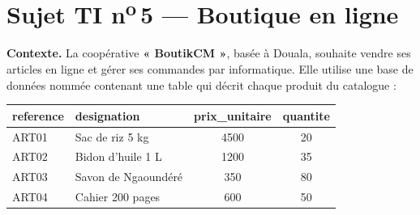 \section{Sujet TI n\textsuperscript{o}\,5 — Boutique en ligne}

\begin{center}
\setlength{\fboxsep}{8pt}
\end{center}

\medskip
\noindent\textbf{Contexte.} La coopérative \textbf{« BoutikCM »}, basée à Douala,
souhaite vendre ses articles en ligne et gérer ses commandes par informatique. Elle
utilise une base de données nommée  contenant une table 
qui décrit chaque produit du catalogue :

\begin{center}\small
\begin{tabular}{@{}|l|l|c|c|@{}}
\hline
\textbf{reference} & \textbf{designation} & \textbf{prix\_unitaire} & \textbf{quantite}\\
\hline
ART01 & Sac de riz 5 kg  & 4500  & 20\\
\hline
ART02 & Bidon d'huile 1 L & 1200 & 35\\
\hline
ART03 & Savon de Ngaoundéré & 350 & 80\\
\hline
ART04 & Cahier 200 pages & 600 & 50\\
\hline
\end{tabular}
\end{center}

